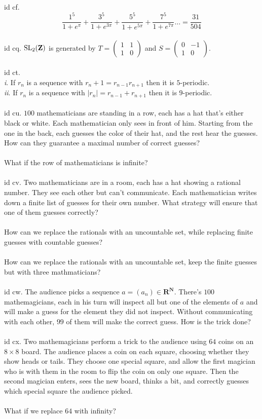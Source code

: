 \documentclass[oneside]{book}
\newcommand{\Z}{\mathbf{Z}}
\newcommand{\N}{\mathbf{N}}
\newcommand{\R}{\mathbf{R}}
\newcommand{\abs}[1]{\left\lvert #1\right\rvert}
\renewcommand{\i}{{\it i}. }
\newcommand{\ii}{{\it ii}. }
\newcommand*\pmat[4]{\begin{pmatrix}#1&#2\\#3&#4\end{pmatrix}}
\begin{document}
id cf. $$\dfrac{1^5}{1+e^\pi}+\dfrac{3^5}{1+e^{3\pi}}+\dfrac{5^5}{1+e^{5\pi}}+\dfrac{7^5}{1+e^{7\pi}}\dots = \dfrac{31}{504}$$\\


id cq. $\SL_2(\Z)$ is generated by $T=\pmat{1}{1}{1}{0}$ and $S=\pmat{0}{-1}{1}{0}$.\\\\


id ct. \\
\i If $r_n$ is a sequence with $r_{n}+1=r_{n-1}r_{n+1}$ then it is $5$-periodic.\\
\ii If $r_n$ is a sequence with $\abs{r_n}=r_{n-1}+r_{n+1}$ then it is $9$-periodic.\\\\


id cu. $100$ mathematicians are standing in a row, each has a hat that's either black or white. Each mathematician only sees in front of him. Starting from the one in the back, each guesses the color of their hat, and the rest hear the guesses. How can they guarantee a maximal number of correct guesses?\\\\
What if the row of mathematicians is infinite?\\\\


id cv. Two mathematicians are in a room, each has a hat showing a rational number. They see each other but can't communicate. Each mathematician writes down a finite list of guesses for their own number. What strategy will ensure that one of them guesses correctly?\\\\
How can we replace the rationals with an uncountable set, while replacing finite guesses with countable guesses?\\\\
How can we replace the rationals with an uncountable set, keep the finite guesses but with three mathmaticians?\\\\


id cw. The audience picks a sequence $a=(a_n)\in\R^\N$. There's $100$ mathemagicians, each in his turn will inspect all but one of the elements of $a$ and will make a guess for the element they did not inspect. Without communicating with each other, $99$ of them will make the correct guess. How is the trick done?\\\\  


id cx. Two mathemagicians perform a trick to the audience using $64$ coins on an $8\times 8$ board. The audience places a coin on each square, choosing whether they show heads or tails. They choose one special square, and allow the first magician who is with them in the room to flip the coin on only one square. Then the second magician enters, sees the new board, thinks a bit, and correctly guesses which special square the audience picked.\\\\
What if we replace $64$ with infinity?\\\\
\end{document}
